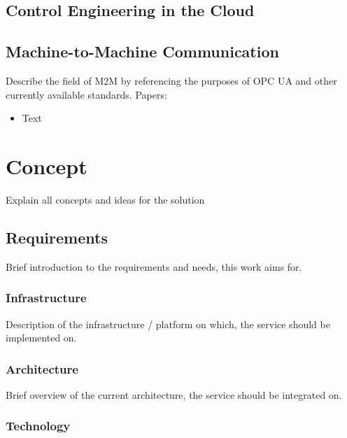 \documentclass[
a4paper,
twoside,
bibliography=totoc,
headsepline,
cleardoublepage=empty,
parskip=half,
draft=false
]{scrbook}
\begin{document}
		\section{Control Engineering in the Cloud}\label{sec:control_engineering_in_the_cloud}
		
		\section{Machine-to-Machine Communication}\label{sec:machine_to_machine_communication}
		
			Describe the field of M2M by referencing the purposes of OPC UA and other currently available standards. Papers:
			
			\begin{itemize}
				
				\item Text
				
			\end{itemize}
				
	\chapter{Concept} \label{ch:concept}
	
		Explain all concepts and ideas for the solution
		
		\section{Requirements} \label{sec:requirements}
		
			Brief introduction to the requirements and needs, this work aims for.
		
			\subsection{Infrastructure} \label{subsec:infrastructure}
			
				Description of the infrastructure / platform on which, the service should be implemented on.
			
			\subsection{Architecture} \label{subsec:architecture}
			
				Brief overview of the current architecture, the service should be integrated on.
			
			\subsection{Technology} \label{subsec:technology}
			
\end{document}
